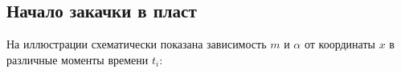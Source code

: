 \subsection{Начало закачки в пласт}
\par На иллюстрации схематически показана зависимость $m$ и $\alpha$ от координаты $x$ в различные моменты времени $t_{i}$:
\begin{figure}[h!]
\caption{}
\label{fig:image1}
\end{figure}